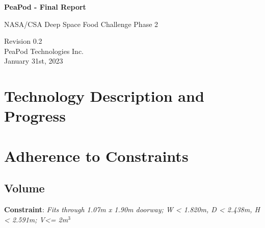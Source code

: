 \documentclass{../tex/report}
\begin{document}
\begin{titlepage}
    \begin{center}
        \vspace*{1.2cm}

        \textbf{\large{PeaPod - Final Report}}

        \vspace{0.5cm}

        NASA/CSA Deep Space Food Challenge Phase 2

        \vfill
        
        \vspace{.75cm}

        Revision 0.2\\
        PeaPod Technologies Inc.\\
        January 31st, 2023

    \end{center}
\end{titlepage}

\thispagestyle{plain}

\tableofcontents
\newpage

\section{Technology Description and Progress}






\section{Adherence to Constraints}

\subsection{Volume}

\textbf{Constraint}: \textit{Fits through 1.07m x 1.90m doorway; W < 1.820m, D < 2.438m, H < 2.591m; V<= 2m${}^3$}
\end{document}
